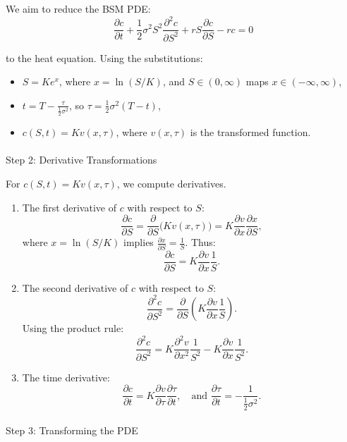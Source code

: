 \documentclass[
  letterpaper,
  DIV=11,
  numbers=noendperiod]{scrartcl}
\makeatletter
\let\oldparagraph\paragraph
\renewcommand{\paragraph}{
    \@ifstar
      \xxxParagraphStar
      \xxxParagraphNoStar
  }
\newcommand{\xxxParagraphStar}[1]{\oldparagraph*{#1}\mbox{}}
\newcommand{\xxxParagraphNoStar}[1]{\oldparagraph{#1}\mbox{}}
\providecommand{\tightlist}{%
  \setlength{\itemsep}{0pt}\setlength{\parskip}{0pt}}
\makeatother
\begin{document}
We aim to reduce the BSM PDE: \[
\frac{\partial c}{\partial t} + \frac{1}{2} \sigma^2 S^2 \frac{\partial^2 c}{\partial S^2} + r S \frac{\partial c}{\partial S} - r c = 0
\]

to the heat equation. Using the substitutions:

\begin{itemize}
\tightlist
\item
  \(S = K e^x\), where \(x = \ln(S / K)\), and \(S \in (0, \infty)\)
  maps \(x \in (-\infty, \infty)\),
\item
  \(t = T - \frac{\tau}{\frac{1}{2} \sigma^2}\), so
  \(\tau = \frac{1}{2} \sigma^2 (T - t)\),
\item
  \(c(S, t) = K v(x, \tau)\), where \(v(x, \tau)\) is the transformed
  function.
\end{itemize}

\paragraph{Step 2: Derivative
Transformations}\label{step-2-derivative-transformations}

For \(c(S, t) = K v(x, \tau)\), we compute derivatives.

\begin{enumerate}
\def\labelenumi{\arabic{enumi}.}
\item
  The first derivative of \(c\) with respect to \(S\): \[
  \frac{\partial c}{\partial S} = \frac{\partial}{\partial S} \big(K v(x, \tau)\big) = K \frac{\partial v}{\partial x} \frac{\partial x}{\partial S},
  \] where \(x = \ln(S / K)\) implies
  \(\frac{\partial x}{\partial S} = \frac{1}{S}\). Thus: \[
  \frac{\partial c}{\partial S} = K \frac{\partial v}{\partial x} \frac{1}{S}.
  \]
\item
  The second derivative of \(c\) with respect to \(S\): \[
  \frac{\partial^2 c}{\partial S^2} = \frac{\partial}{\partial S} \left( K \frac{\partial v}{\partial x} \frac{1}{S} \right).
  \] Using the product rule: \[
  \frac{\partial^2 c}{\partial S^2} = K \frac{\partial^2 v}{\partial x^2} \frac{1}{S^2} - K \frac{\partial v}{\partial x} \frac{1}{S^2}.
  \]
\item
  The time derivative: \[
  \frac{\partial c}{\partial t} = K \frac{\partial v}{\partial \tau} \frac{\partial \tau}{\partial t}, \quad \text{and } \frac{\partial \tau}{\partial t} = -\frac{1}{\frac{1}{2} \sigma^2}.
  \]
\end{enumerate}

\paragraph{Step 3: Transforming the
PDE}\label{step-3-transforming-the-pde}
\end{document}
